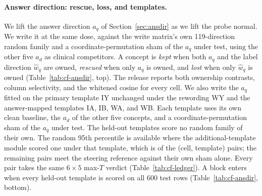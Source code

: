 \paragraph{Answer direction: rescue, loss, and templates.} We lift the answer direction $a_q$ of Section~\ref{sec:ansdir} as we lift the probe normal. We write it at the same dose, against the write matrix's own 119-direction random family and a coordinate-permutation sham of the $a_q$ under test, using the other five $a_d$ as clinical competitors. A concept is \emph{kept} when both $a_q$ and the label direction $\hat w_q$ are owned, \emph{rescued} when only $a_q$ is owned, and \emph{lost} when only $\hat w_q$ is owned (Table~\ref{tab:cf-ansdir}, top). The release reports both ownership contrasts, column selectivity, and the whitened cosine for every cell. We also write the $a_q$ fitted on the primary template IY unchanged under the rewording WY and the answer-mapped templates IA, IB, WA, and WB. Each template uses its own clean baseline, the $a_d$ of the other five concepts, and a coordinate-permutation sham of the $a_q$ under test. The held-out templates score no random family of their own. The random 95th percentile is available where the additional-template module scored one under that template, which is \cfAnsdirtRefPairs{} of the \cfAnsdirtLedgerPairs{} (cell, template) pairs; the remaining \cfAnsdirtShamPairs{} pairs meet the steering reference against their own sham alone. Every pair takes the same $6\times5$ max-$T$ verdict (Table~\ref{tab:cf-ledger}). A block enters when every held-out template is scored on all 600 test rows (Table~\ref{tab:cf-ansdir}, bottom).

